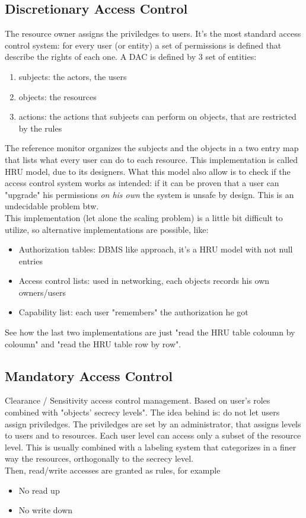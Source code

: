 \documentclass{article}
\begin{document}
			\subsection{Discretionary Access Control}
				The resource owner assigns the priviledges to users. It's the most standard access control system: for every user (or entity) a set of permissions is defined that describe the rights of each one. A DAC is defined by 3 set of entities:
				\begin{enumerate}
					\item subjects: the actors, the users
					\item objects: the resources
					\item actions: the actions that subjects can perform on objects, that are restricted by the rules
				\end{enumerate}
				The reference monitor organizes the subjects and the objects in a two entry map that lists what every user can do to each resource. This implementation is called HRU model, due to its designers. What this model also allow is to check if the access control system works as intended: if it can be proven that a user can "upgrade" his permissions \emph{on his own} the system is unsafe by design. This is an undecidable problem btw.\\
				This implementation (let alone the scaling problem) is a little bit difficult to utilize, so alternative implementations are possible, like:
				\begin{itemize}
					\item Authorization tables: DBMS like approach, it's a HRU model with not null entries
					\item Access control lists: used in networking, each objects records his own owners/users
					\item Capability list: each user "remembers" the authorization he got
				\end{itemize}
				See how the last two implementations are just "read the HRU table coloumn by coloumn" and "read the HRU table row by row".
				
			
			\subsection{Mandatory Access Control}
				Clearance / Sensitivity access control management. Based on user's roles combined with "objects' secrecy levels". The idea behind is: do not let users assign priviledges. The priviledges are set by an administrator, that assigns levels to users and to resources. Each user level can access only a subset of the resource level. This is usually combined with a labeling system that categorizes in a finer way the resources, orthogonally to the secrecy level.\\
				Then, read/write accesses are granted as rules, for example
				\begin{itemize}
					\item No read up
					\item No write down
				\end{itemize}
			
\end{document}
